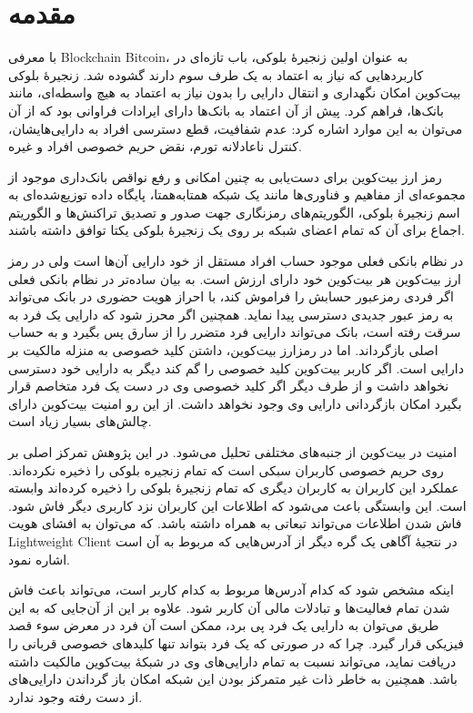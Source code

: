 
\chapter{مقدمه}
با معرفی \gls{Blockchain} \gls{Bitcoin}، به عنوان اولین زنجیرهٔ بلوکی، باب تازه‌ای در کاربرد‌هایی که نیاز به اعتماد به یک طرف سوم دارند گشوده شد. زنجیرهٔ بلوکی بیت‌کوین امکان نگهداری و انتقال دارایی را بدون نیاز به اعتماد به هیچ واسطه‌ای، مانند بانک‌ها،‌ فراهم کرد. پیش از آن اعتماد به بانک‌ها دارای ایرادات فراوانی بود که از آن می‌توان به این موارد اشاره کرد: عدم شفافیت، قطع دسترسی افراد به دارایی‌هایشان، کنترل ناعادلانه تورم، نقض حریم خصوصی افراد و غیره. 

رمز ارز بیت‌کوین برای دست‌یابی به چنین امکانی و رفع نواقص بانک‌داری موجود از مجموعه‌ای از مفاهیم و فناوری‌ها مانند یک شبکه همتا‌به‌همتا، پایگاه داده توزیع‌شده‌ای به اسم زنجیرهٔ بلوکی، الگوریتم‌های رمزنگاری جهت صدور و تصدیق تراکنش‌ها و الگوریتم اجماع برای آن‌ که تمام اعضای شبکه بر روی یک زنجیرهٔ بلوکی یکتا توافق داشته باشند. 

در نظام بانکی فعلی موجود حساب افراد مستقل از خود دارایی آن‌ها است ولی در رمز ارز بیت‌کوین هر بیت‌کوین خود دارای ارزش است. به بیان ساده‌تر در نظام بانکی فعلی اگر فردی رمزعبور حسابش را فراموش کند، با احراز هویت حضوری در بانک می‌تواند به رمز عبور جدیدی دسترسی پیدا نماید. همچنین اگر محرز شود که دارایی یک فرد به سرقت رفته است، بانک می‌تواند دارایی فرد متضرر را از سارق پس بگیرد و به حساب اصلی بازگرداند. اما در رمزارز بیت‌کوین، داشتن کلید خصوصی به منزله مالکیت بر دارایی است. اگر کاربر بیت‌کوین کلید خصوصی را گم کند دیگر به دارایی خود دسترسی نخواهد داشت و از طرف دیگر اگر کلید خصوصی وی در دست یک فرد متخاصم قرار بگیرد امکان بازگردانی دارایی وی وجود نخواهد داشت. از این رو امنیت بیت‌کوین دارای چالش‌های بسیار زیاد است.

امنیت در بیت‌کوین از جنبه‌های مختلفی تحلیل می‌شود. در این پژوهش تمرکز اصلی بر روی حریم خصوصی کاربران سبکی است که تمام زنجیره بلوکی را ذخیره نکرده‌اند. عملکرد این کاربران به کاربران دیگری که تمام زنجیره‌ٔ بلوکی را ذخیره کرده‌اند وابسته است. این وابستگی باعث می‌شود که اطلاعات این کاربران نزد کاربری دیگر فاش شود. فاش شدن اطلاعات می‌تواند تبعاتی به همراه داشته باشد. که می‌توان به افشای هویت 
\gls{Lightweight Client}
در نتجیهٔ آگاهی یک گره دیگر از آدرس‌هایی که مربوط به آن است اشاره نمود. 

اینکه مشخص شود که کدام آدرس‌ها مربوط به کدام کاربر است، می‌تواند باعث فاش شدن تمام فعالیت‌ها و تبادلات مالی آن کاربر شود. علاوه بر این از آن‌جایی که به این طریق می‌توان به دارایی یک فرد پی برد، ممکن است آن فرد در معرض سوء قصد فیزیکی قرار گیرد. چرا که در صورتی که یک فرد بتواند تنها کلید‌های خصوصی قربانی را دریافت نماید، می‌تواند نسبت به تمام دارایی‌های وی در شبکه‌ٔ بیت‌کوین مالکیت داشته باشد. همچنین به خاطر ذات غیر متمرکز بودن این شبکه امکان باز گرداندن دارایی‌های از دست رفته وجود ندارد.

